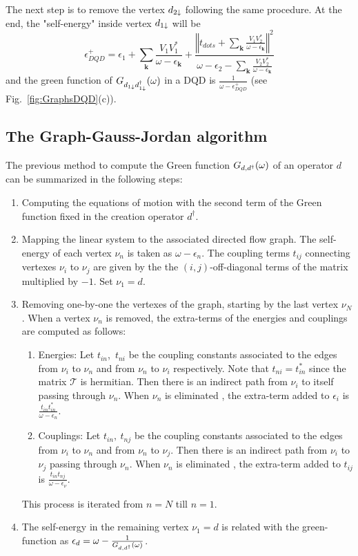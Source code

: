 \documentclass[showpacs,aps,prb,reprint,superscriptaddress]{revtex4-2}
\begin{document}
The next step is to remove the vertex $d_{2\downarrow}$ following the same procedure. At the end, the "self-energy" inside  vertex $d_{1\downarrow}$ will be
\begin{equation}
    \epsilon^+_{DQD}=\epsilon_{1}+\sum_{\mathbf{k}}\frac{V_{1}V_{1}^{*}}{\omega-\epsilon_{\mathbf{k}}}+\frac{\left\Vert t_{dots}+\sum_{\mathbf{k}}\frac{V_{1}V_{2}^{*}}{\omega-\epsilon_{\mathbf{k}}}\right\Vert ^{2}}{\omega-\epsilon_{2}-\sum_{\mathbf{k}}\frac{V_{2}V_{2}^{*}}{\omega-\epsilon_{\mathbf{k}}}} \label{eq:EnDQD}
\end{equation}
and the green function of $G_{d_{1\downarrow}d^\dagger_{1\downarrow}}(\omega)$ in a DQD is $\frac{1}{\omega -  \epsilon^+_{DQD}}$ (see Fig.\ \ref{fig:GraphsDQD}(c)).

\subsection{The Graph-Gauss-Jordan algorithm}

The previous method to compute the Green function  $G_{d,d^\dagger}(\omega)$ of an operator $d$ can be summarized in the following steps:

\begin{enumerate}
    \item Computing the equations of motion with the second term of the Green function fixed in the creation operator $d^\dagger$. 
     \item  Mapping the linear system to the associated directed flow graph. The self-energy of each vertex $\nu_n$ is taken as $\omega-\epsilon_{n}$.  The coupling terms $t_{ij}$ connecting vertexes $\nu_i$ to $\nu_j$ are given by the the $(i,j)$-off-diagonal terms of the matrix multiplied by $-1$. Set $\nu_1 = d$.  
    \item Removing one-by-one the vertexes of the graph, starting by the last vertex $\nu_N$. When a  vertex $\nu_n$ is removed, the extra-terms of the energies and couplings are computed as follows:
      \begin{enumerate}
        \item Energies: Let $t_{in}$,\ $t_{ni}$ be the coupling constants associated to the edges from $\nu_i$ to $\nu_n$  and from $\nu_n$ to $\nu_i$ respectively. Note that $t_{ni} = t_{in}^*$ since the matrix $\mathcal{T}$ is hermitian. Then there is an indirect path from $\nu_i$ to itself passing through $\nu_n$. When  $\nu_n$ is eliminated , the extra-term added to $\epsilon_{i}$ is   $\frac{t_{in}t^*_{in}}{\omega-\epsilon_{n}}$. 
        \item Couplings: Let $t_{in},\ t_{nj}$ be the coupling constants associated to the edges from $\nu_i$ to $\nu_n$  and from $\nu_n$ to $\nu_j$. Then there is an indirect path from $\nu_i$ to $\nu_j$ passing through $\nu_n$. When  $\nu_n$ is eliminated , the extra-term added to $t_{ij}$ is   $\frac{t_{in}t_{nj}}{\omega-\epsilon_{\nu}}$. 
        \end{enumerate}
    \ignorespacesafterend  
    This process is iterated from $n=N$ till $n=1$.
    \item The self-energy in the remaining vertex $\nu_1 = d$ is related with the green-function as $\epsilon_d = \omega -\frac{1}{ G_{d,d^\dagger}(\omega)}$.
\end{enumerate}
    
\end{document}
